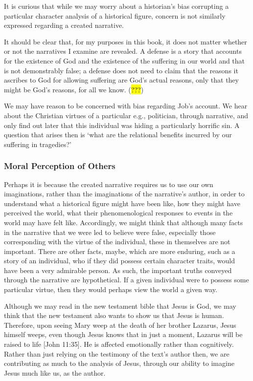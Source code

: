 \documentclass[
  letterpaper,
  DIV=11,
  numbers=noendperiod]{scrartcl}
\theoremstyle{remark}
\begin{document}
It is curious that while we may worry about a historian's bias
corrupting a particular character analysis of a historical figure,
concern is not similarly expressed regarding a created narrative.

It should be clear that, for my purposes in this book, it does not
matter whether or not the narratives I examine are revealed. A defense
is a story that accounts for the existence of God and the existence of
the suffering in our world and that is not demonstrably false; a defense
does not need to claim that the reasons it ascribes to God for allowing
suffering are God's actual reasons, only that they might be God's
reasons, for all we know. (\hl{???})

We may have reason to be concerned with bias regarding Job's account. We
hear about the Christian virtues of a particular e.g., politician,
through narrative, and only find out later that this individual was
hiding a particularly horrific sin. A question that arises then is `what
are the relational benefits incurred by our suffering in tragedies?'

\subsubsection{Moral Perception of
Others}\label{moral-perception-of-others-1}

Perhaps it is because the created narrative requires us to use our own
imaginations, rather than the imaginations of the narrative's author, in
order to understand what a historical figure might have been like, how
they might have perceived the world, what their phenomenological
responses to events in the world may have felt like. Accordingly, we
might think that although many facts in the narrative that we were led
to believe were false, especially those corresponding with the virtue of
the individual, these in themselves are not important. There are other
facts, maybe, which are more enduring, such as a story of an individual,
who if they did possess certain character traits, would have been a very
admirable person. As such, the important truths conveyed through the
narrative are hypothetical. If a given individual were to possess some
particular virtue, then they would perhaps view the world a given way.

Although we may read in the new testament bible that Jesus is God, we
may think that the new testament also wants to show us that Jesus is
human. Therefore, upon seeing Mary weep at the death of her brother
Lazarus, Jesus himself weeps, even though Jesus knows that in just a
moment, Lazarus will be raised to life {[}John 11:35{]}. He is affected
emotionally rather than cognitively. Rather than just relying on the
testimony of the text's author then, we are contributing as much to the
analysis of Jesus, through our ability to imagine Jesus much like us, as
the author.
\end{document}
